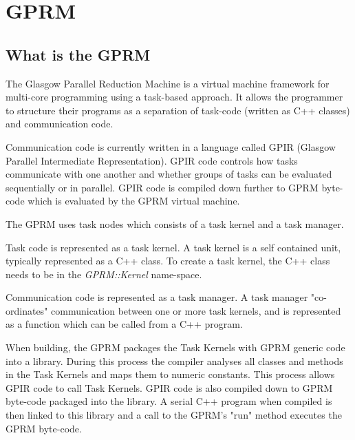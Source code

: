 \section{GPRM}

\subsection{What is the GPRM}

The Glasgow Parallel Reduction Machine is a virtual machine framework for multi-core programming using a task-based approach. It allows the programmer to structure their programs as a separation of task-code (written as C++ classes) and communication code. 

Communication code is currently written in a language called GPIR (Glasgow Parallel Intermediate Representation). 
GPIR code controls how tasks communicate with one another and whether groups
of tasks can be evaluated sequentially or in parallel.  GPIR code is compiled down further to GPRM byte-code which is evaluated by the GPRM virtual machine.

The GPRM uses task nodes which consists of a task kernel and a task manager.

Task code is represented as a task kernel. A task kernel is a self contained unit, typically represented as a C++ class.
To create a task kernel, the C++ class needs to be in the \textit{GPRM::Kernel} name-space.

Communication code is represented as a task manager. A task manager "co-ordinates" communication between one or more task kernels, and
is represented as a function which can be called from a C++ program.\cite{GPRM}


When building, the GPRM packages the Task Kernels with 
GPRM generic code into a library. During this process the compiler analyses all classes and methods in the
Task Kernels and maps them to numeric constants. This process allows GPIR code to call Task Kernels.
GPIR code is also compiled down to GPRM byte-code packaged into the library. A serial C++ program when compiled is then linked to
this library and a call to the GPRM's "run" method executes the GPRM byte-code. 

\newpage

